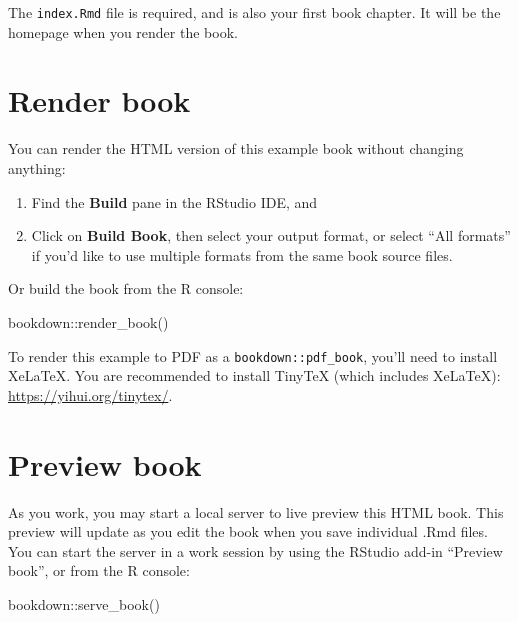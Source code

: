 \documentclass[
]{book}
\newenvironment{Shaded}{\begin{snugshade}}{\end{snugshade}}
\newcommand{\FunctionTok}[1]{\textcolor[rgb]{0.00,0.00,0.00}{#1}}
\newcommand{\NormalTok}[1]{#1}
\newcommand{\SpecialCharTok}[1]{\textcolor[rgb]{0.00,0.00,0.00}{#1}}
\theoremstyle{definition}
\theoremstyle{definition}
\theoremstyle{definition}
\theoremstyle{definition}
\theoremstyle{remark}
\begin{document}
The \texttt{index.Rmd} file is required, and is also your first book chapter. It will be the homepage when you render the book.

\hypertarget{render-book}{%
\section{Render book}\label{render-book}}

You can render the HTML version of this example book without changing anything:

\begin{enumerate}
\def\labelenumi{\arabic{enumi}.}
\item
  Find the \textbf{Build} pane in the RStudio IDE, and
\item
  Click on \textbf{Build Book}, then select your output format, or select ``All formats'' if you'd like to use multiple formats from the same book source files.
\end{enumerate}

Or build the book from the R console:

\begin{Shaded}
\begin{Highlighting}[]
\NormalTok{bookdown}\SpecialCharTok{::}\FunctionTok{render\_book}\NormalTok{()}
\end{Highlighting}
\end{Shaded}

To render this example to PDF as a \texttt{bookdown::pdf\_book}, you'll need to install XeLaTeX. You are recommended to install TinyTeX (which includes XeLaTeX): \url{https://yihui.org/tinytex/}.

\hypertarget{preview-book}{%
\section{Preview book}\label{preview-book}}

As you work, you may start a local server to live preview this HTML book. This preview will update as you edit the book when you save individual .Rmd files. You can start the server in a work session by using the RStudio add-in ``Preview book'', or from the R console:

\begin{Shaded}
\begin{Highlighting}[]
\NormalTok{bookdown}\SpecialCharTok{::}\FunctionTok{serve\_book}\NormalTok{()}
\end{Highlighting}
\end{Shaded}
\end{document}
